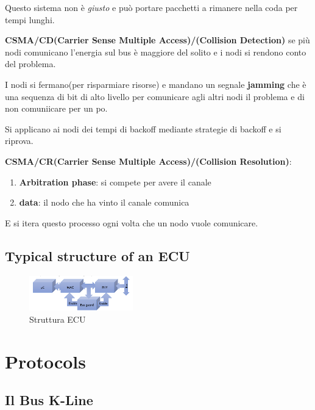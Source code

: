 Questo sistema non è \textit{giusto} e può portare pacchetti a rimanere nella coda per tempi lunghi.




\textbf{CSMA/CD(Carrier Sense Multiple Access)/(Collision Detection)} se più nodi comunicano l'energia sul bus è maggiore del solito e i nodi si rendono conto del problema.

I nodi si fermano(per risparmiare risorse) e mandano un segnale \textbf{jamming} che è una sequenza di bit di alto livello per comunicare agli altri nodi il problema e di non comuniicare per un po.

Si applicano ai nodi dei tempi di backoff mediante strategie di backoff e si riprova.

\textbf{CSMA/CR(Carrier Sense Multiple Access)/(Collision Resolution)}:
\begin{enumerate}
  \item \textbf{Arbitration phase}: si compete per avere il canale
  \item \textbf{data}: il nodo che ha vinto il canale comunica
\end{enumerate}

E si itera questo processo ogni volta che un nodo vuole comunicare.


\subsection{Typical structure of an ECU}
\begin{figure}[!ht]
  \centering
  \includegraphics[width=0.4\textwidth]{./images/ecu.png}
  \caption{Struttura ECU}
  \label{fir:struttura_ecu}
\end{figure}





\section{Protocols}


\subsection{Il Bus K-Line}


